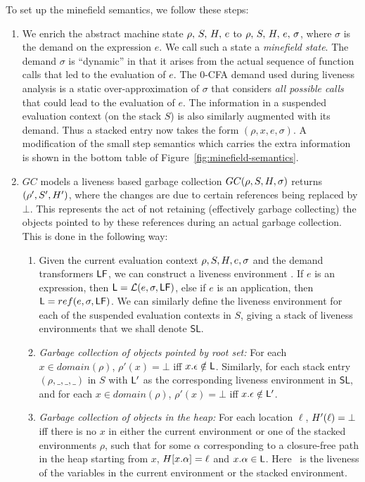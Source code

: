 \documentclass[preprint,9pt]{sigplanconf}
\begin{document}
To set up the minefield semantics, we follow these steps:
\begin{enumerate}
\item   We   enrich    the   abstract   machine   state
  $\rho,\,S,\,H,\,e$   to  $\rho,\,S,\,H,\,e,\,\sigma$,
  where  $\sigma$  is  the  demand  on  the  expression
  $e$. We  call such a state  a \emph{minefield state}.
  The demand $\sigma$ is  ``dynamic'' in that it arises
  from the  actual sequence of function  calls that led
  to  the evaluation  of  $e$.  The  0-CFA demand  used
  during    liveness     analysis    is     a    static
  over-approximation   of   $\sigma$   that   considers
  \emph{all  possible calls}  that  could  lead to  the
  evaluation of  $e$.  The  information in  a suspended
  evaluation  context  (on  the   stack  $S$)  is  also
  similarly augmented with its  demand.  Thus a stacked
  entry now takes  the form $(\rho, x,  e, \sigma)$.  A
  modification  of  the   small  step  semantics  which
  carries the extra information  is shown in the bottom
  table of Figure~\ref{fig:minefield-semantics}.
\item $GC$  models a liveness based  garbage collection
  $GC(\rho, S,  H, \sigma)$ returns $(\rho',  S', H')$,
  where the changes are due to certain references being
  replaced by  $\bot$.  This represents the  act of not
  retaining   (effectively   garbage  collecting)   the
  objects  pointed to  by  these  references during  an
  actual  garbage  collection.  This  is  done  in  the
  following way:
  \begin{enumerate}
  \item Given the current  evaluation context $\rho, S,
    H,   e,  \sigma$   and   the  demand   transformers
    $\mathsf{LF}$, we can  construct a liveness environment
    \Lv.   If  $e$  is  an expression,  then  $  \mathsf{L}  =
    \mathcal{L}(e, \sigma, \mathsf{LF})$, else if $e$ is an
    application, then $ \mathsf{L} = ref(e, \sigma, \mathsf{LF})$.
    We  can similarly  define the  liveness environment
    for each  of the  suspended evaluation  contexts in
    $S$, giving  a stack of liveness  environments that
    we shall denote $\mathsf{SL}$.
  \item \emph{Garbage collection  of objects pointed by
    root   set:}  For   each   $x  \in   domain(\rho)$,
    $\rho'(x)=\bot$     iff      $x.\epsilon     \notin
    \mathsf{L}$.    Similarly,    for   each    stack    entry
    $(\rho,\_,\_,\_)$  in   $S$  with  $\mathsf{L}'$   as  the
    corresponding      liveness     environment      in
    $\mathsf{SL}$, and  for each $x  \in domain(\rho)$,
    $\rho'(x)=\bot$ iff $x.\epsilon \notin \mathsf{L}'$.
  \item  \emph{Garbage  collection  of objects  in  the
    heap:} For each location  $\ell$, $H'(\ell) = \bot$
    iff  there   is  no  $x$  in   either  the  current
    environment  or  one  of the  stacked  environments
    $\rho$, such  that for some  $\alpha$ corresponding
    to a  closure-free path  in the heap  starting from
    $x$,  $H[x.\alpha]   =  \ell$  and   $x.\alpha  \in
    \mathsf{L}$. Here \Lv\ is the liveness of the variables in
    the current environment or the stacked environment.


\end{enumerate}
\end{enumerate}
\end{document}
